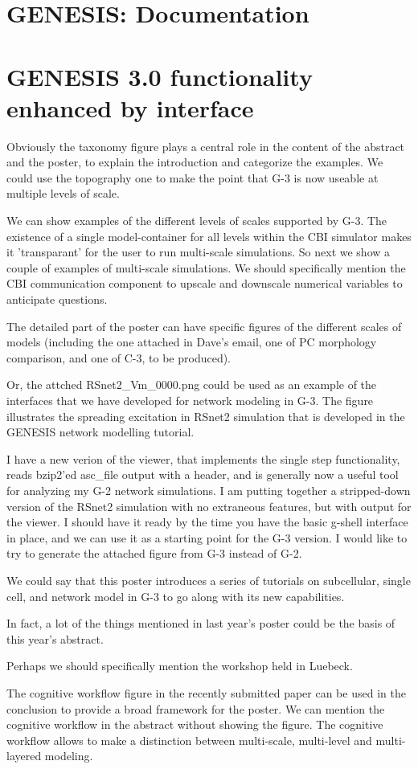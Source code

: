 \documentclass[12pt]{article}
\begin{document}
\section*{GENESIS: Documentation}

\section*{GENESIS 3.0 functionality enhanced by interface}


Obviously the taxonomy figure plays a central role in the content of
the abstract and the poster, to explain the introduction and
categorize the examples.
We could use the topography
one to make the point that G-3 is now useable at multiple
levels of scale.

We can show examples of the different levels of scales supported by
G-3.  The existence of a single model-container for all levels within
the CBI simulator makes it 'transparant' for the user to run
multi-scale simulations.  So next we show a couple of examples of
multi-scale simulations.  We should specifically mention the CBI
communication component to upscale and downscale numerical variables
to anticipate questions.


The detailed part of the poster can have specific figures of the
different scales of models (including the one attached in Dave's
email, one of PC morphology comparison, and one of C-3, to be
produced).

Or, the attched RSnet2\_Vm\_0000.png could be used as an example of the
interfaces that we have developed for network modeling in G-3.
The figure illustrates the spreading excitation
in RSnet2 simulation that is developed in the GENESIS network
modelling tutorial.

I have a new verion of the viewer, that implements the single step
functionality, reads bzip2'ed asc\_file output with a header, and is
generally now a useful tool for analyzing my G-2 network simulations.
I am putting together a stripped-down version of the RSnet2 simulation
with no extraneous features, but with output for the viewer.  I should
have it ready by the time you have the basic g-shell interface in
place, and we can use it as a starting point for the G-3 version.  I
would like to try to generate the attached figure from G-3 instead of
G-2.


We could say that this poster introduces a series of tutorials on
subcellular, single cell, and network model in G-3 to go along with
its new capabilities.

In fact, a lot of the things mentioned in last year's poster could be
the basis of this year's abstract.

Perhaps we should specifically mention the workshop held in Luebeck.


The cognitive workflow figure in the recently submitted paper can be
used in the conclusion to provide a broad framework for the poster.
We can mention the cognitive workflow in the abstract without showing
the figure.  The cognitive workflow allows to make a distinction
between multi-scale, multi-level and multi-layered modeling.
\end{document}
